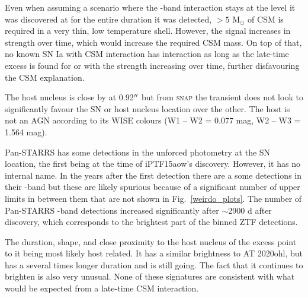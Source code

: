 \documentclass[a4paper,oneside,12pt, class=Latex/Classes/PhDthesisPSnPDF, crop=false]{standalone}
\begin{document}
Even when assuming a scenario where the \ztfr-band interaction stays at the level it was discovered at for the entire duration it was detected, $> 5$ M$_\odot$ of CSM is required in a very thin, low temperature shell. However, the signal increases in strength over time, which would increase the required CSM mass. On top of that, no known SN Ia with CSM interaction has interaction as long as the late-time excess is found for or with the strength increasing over time, further disfavouring the CSM explanation.

The host nucleus is close by at 0.92$^{\prime\prime}$ but from \textsc{snap} the transient does not look to significantly favour the SN or host nucleus location over the other. The host is not an AGN according to its WISE colours (W1 -- W2 = 0.077 mag, W2 -- W3 = 1.564 mag). 

Pan-STARRS has some detections in the unforced photometry at the SN location, the first being at the time of iPTF15aow's discovery. However, it has no internal name. In the years after the first detection there are a some detections in their \ztfi-band but these are likely spurious because of a significant number of upper limits in between them that are not shown in Fig.~\ref{weirdo_plots}. The number of Pan-STARRS \ztfi-band detections increased significantly after $\sim$2900 d after discovery, which corresponds to the brightest part of the binned ZTF detections.

The duration, shape, and close proximity to the host nucleus of the excess point to it being most likely host related. It has a similar brightness to AT 2020ohl, but has a several times longer duration and is still going. The fact that it continues to brighten is also very unusual. None of these signatures are consistent with what would be expected from a late-time CSM interaction.
\end{document}
